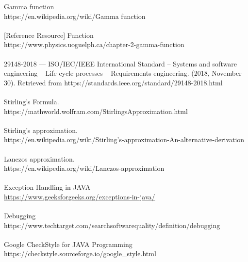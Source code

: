 \documentclass[12pt,a4paper]{report}
\begin{document}
\begin{thebibliography}{15}


\indent\indent
Gamma function \\
https://en.wikipedia.org/wiki/Gamma function\\ \\

[Reference Resource] Function \\ https://www.physics.uoguelph.ca/chapter-2-gamma-function\\ \\

\setlength{\parindent}{1em}
29148-2018 --- ISO/IEC/IEEE International Standard -- Systems and software engineering -- Life cycle processes -- Requirements engineering. (2018, November 30). Retrieved from https://standards.ieee.org/standard/29148-2018.html \\ \\

Stirling's Formula.\\
https://mathworld.wolfram.com/StirlingsApproximation.html\\ \\


Stirling's approximation. \\ https://en.wikipedia.org/wiki/Stirling's-approximation-An-alternative-derivation \\ \\


Lanczos approximation.\\ https://en.wikipedia.org/wiki/Lanczos-approximation \\ \\

Exception Handling in JAVA\\
\href{https://www.geeksforgeeks.org/exceptions-in-java/}{https://www.geeksforgeeks.org/exceptions-in-java/} \\ \\

Debugging \\
https://www.techtarget.com/searchsoftwarequality/definition/debugging\\ \\


Google CheckStyle for JAVA Programming\\
https://checkstyle.sourceforge.io/google\_style.html \\ \\


\end{thebibliography}
\end{document}
